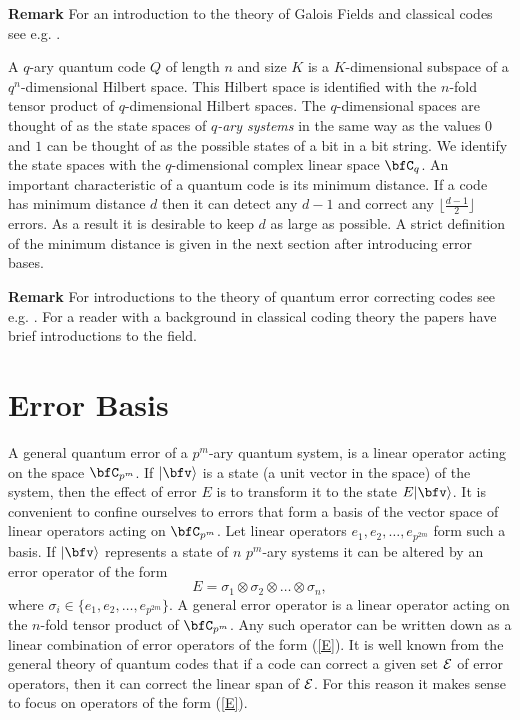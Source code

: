 \documentclass{article}
\begin{document}
{\bf Remark} For an introduction to the theory of Galois Fields and
classical codes see e.g. \cite{macw77}.

A $q$-ary quantum code $Q$ of length $n$ and size $K$ is a
$K$-dimensional subspace of a $q^n$-dimensional Hilbert space.  This
Hilbert space is identified with the $n$-fold tensor product of
$q$-dimensional Hilbert spaces. The $q$-dimensional spaces are thought
of as the state spaces of \emph{$q$-ary systems} in the same way as
the values $0$ and $1$ can be thought of as the possible states of a
bit in a bit string.  We identify the state spaces with the
$q$-dimensional complex linear space $\bfC_q$.  An important
characteristic of a quantum code is its minimum distance. If a code
has minimum distance $d$ then it can detect any $d-1$ and correct any
$\lfloor \frac{d-1}{2} \rfloor$ errors. As a result it is desirable to
keep $d$ as large as possible. A strict definition of the minimum
distance is given in the next section after introducing error bases.

{\bf Remark} For introductions to the theory of quantum error
correcting codes see e.g. \cite{knill97,Gottesman97,knill99}.
For a reader with a background in classical coding theory 
the papers \cite{Ashikhmin99,Ashikhmin00_1,Ashikhmin00_2} have
brief introductions to the field. 

\section{Error Basis}\label{error_basis}

A general quantum error of a $p^m$-ary quantum system, is a linear
operator acting on the space $\bfC_{p^m}$. If $|\bfv\rangle$ is a state (a
unit vector in the space) of the system, then the effect of error $E$
is to transform it to the state $E |\bfv\rangle$.  It is convenient to
confine ourselves to errors that form a basis of the vector space of
linear operators acting on $\bfC_{p^m}$. Let linear operators $e_1,
e_2, \ldots, e_{p^{2m}}$ form such a basis. 
If $|\bfv\rangle$ represents a
state of $n$ $p^m$-ary systems it can be altered by an error operator of
the form
\begin{equation}\label{E}
E=\sigma_1\otimes \sigma_2\otimes \ldots \otimes \sigma_n,
\end{equation}
where $\sigma_i\in \{e_1, e_2, \ldots, e_{p^{2m}} \}$.  A
general error operator is a linear operator acting on the $n$-fold
tensor product of $\bfC_{p^m}$. Any such operator
can be written down as a linear combination of error operators of the
form (\ref{E}).  It is well known from the general theory of quantum
codes that if a code can correct a given set ${\cal E}$ of
error operators, then it can correct the linear span of ${\cal E}$.
For this reason it makes sense to focus on operators of the form
(\ref{E}).
\end{document}
